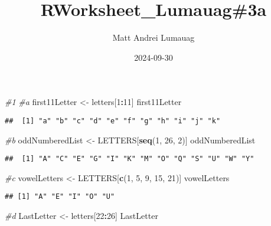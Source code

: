\documentclass[
]{article}
\title{RWorksheet\_Lumauag\#3a}
\author{Matt Andrei Lumauag}
\date{2024-09-30}
\newenvironment{Shaded}{\begin{snugshade}}{\end{snugshade}}
\newcommand{\CommentTok}[1]{\textcolor[rgb]{0.56,0.35,0.01}{\textit{#1}}}
\newcommand{\DecValTok}[1]{\textcolor[rgb]{0.00,0.00,0.81}{#1}}
\newcommand{\FunctionTok}[1]{\textcolor[rgb]{0.13,0.29,0.53}{\textbf{#1}}}
\newcommand{\NormalTok}[1]{#1}
\newcommand{\OtherTok}[1]{\textcolor[rgb]{0.56,0.35,0.01}{#1}}
\newcommand{\SpecialCharTok}[1]{\textcolor[rgb]{0.81,0.36,0.00}{\textbf{#1}}}
\begin{document}
\maketitle

\begin{Shaded}
\begin{Highlighting}[]
\CommentTok{\#1}
\CommentTok{\#a}
\NormalTok{first11Letter }\OtherTok{\textless{}{-}}\NormalTok{ letters[}\DecValTok{1}\SpecialCharTok{:}\DecValTok{11}\NormalTok{]}
\NormalTok{first11Letter}
\end{Highlighting}
\end{Shaded}

\begin{verbatim}
##  [1] "a" "b" "c" "d" "e" "f" "g" "h" "i" "j" "k"
\end{verbatim}

\begin{Shaded}
\begin{Highlighting}[]
\CommentTok{\#b}
\NormalTok{oddNumberedList }\OtherTok{\textless{}{-}}\NormalTok{ LETTERS[}\FunctionTok{seq}\NormalTok{(}\DecValTok{1}\NormalTok{, }\DecValTok{26}\NormalTok{, }\DecValTok{2}\NormalTok{)]}
\NormalTok{oddNumberedList}
\end{Highlighting}
\end{Shaded}

\begin{verbatim}
##  [1] "A" "C" "E" "G" "I" "K" "M" "O" "Q" "S" "U" "W" "Y"
\end{verbatim}

\begin{Shaded}
\begin{Highlighting}[]
\CommentTok{\#c    }
\NormalTok{vowelLetters }\OtherTok{\textless{}{-}}\NormalTok{ LETTERS[}\FunctionTok{c}\NormalTok{(}\DecValTok{1}\NormalTok{, }\DecValTok{5}\NormalTok{, }\DecValTok{9}\NormalTok{,  }\DecValTok{15}\NormalTok{, }\DecValTok{21}\NormalTok{)]}
\NormalTok{vowelLetters}
\end{Highlighting}
\end{Shaded}

\begin{verbatim}
## [1] "A" "E" "I" "O" "U"
\end{verbatim}

\begin{Shaded}
\begin{Highlighting}[]
\CommentTok{\#d}
\NormalTok{LastLetter }\OtherTok{\textless{}{-}}\NormalTok{ letters[}\DecValTok{22}\SpecialCharTok{:}\DecValTok{26}\NormalTok{]}
\NormalTok{LastLetter}
\end{Highlighting}
\end{Shaded}
\end{document}
